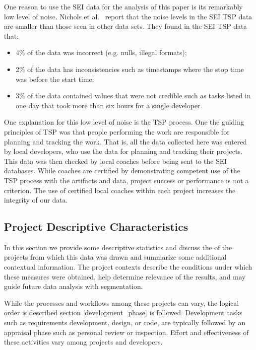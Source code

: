 \documentclass[smallcondensed]{svjour3}
\newcommand{\todo}[1]{\textcolor{Maroon}{TODO: #1}}
\newcommand{\bi}{\begin{itemize}}%
\newcommand{\ei}{\end{itemize}}
\begin{document}
One reason to use the SEI data for the analysis of this paper is its remarkably low level of noise.
Nichols et al.~\cite{shirai14}  report that
the noise levels in the SEI TSP data are smaller than those seen
in other data sets. They found in the SEI TSP data that:\bi 
\item
4\% of the data was incorrect (e.g. nulls, illegal formats);
\item  2\% of the data has inconsistencies such as timestamps
where the stop time was before the start time;
\item 3\% of the data contained values that were not credible
such as tasks listed in one day that took more than six hours for a single developer.
\ei 
One explanation for this low level of noise is the TSP process.
One the guiding principles of TSP was that  people performing the work are  responsible for planning and tracking the work. That is,  all the data collected here was entered
by local developers, who use the data for planning and tracking their projects. This data was then checked by local coaches before being sent to the SEI
databases. While coaches are certified by demonstrating competent use of the TSP process with the artifacts and data,  project success or performance is not a criterion. 
The use of certified local coaches within each project increases the integrity of our data.


 

\subsection{Project Descriptive Characteristics}
\label{sec:data_character}

In this section we provide some descriptive statistics and discuss the of the projects from which this data was drawn and summarize some additional contextual information. The project contexts describe the conditions under which these measures were obtained, help determine relevance of the results, and may guide future data analysis with segmentation. 

While the processes and workflows among these projects can vary, the logical order is described section \ref{development_phase} is followed. Development tasks such as requirements development, design, or code, are typically followed by an appraisal phase such as personal review or inspection. Effort and effectiveness of these activities vary among projects and developers. 
\end{document}
